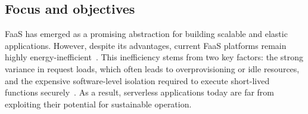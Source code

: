 \subsection{Focus and objectives}

%

FaaS has emerged as a promising abstraction for building scalable and elastic applications.
However, despite its advantages, current FaaS platforms remain highly energy-inefficient~\cite{sharma_challenges_2023}. 
This inefficiency stems from two key factors: the strong variance in request loads, which often leads to overprovisioning or idle resources, and the expensive software-level isolation required to execute short-lived functions securely~\cite{schirmer2023nightshift,ginzburg_serverless_2020}.
As a result, serverless applications today are far from exploiting their potential for sustainable operation.

